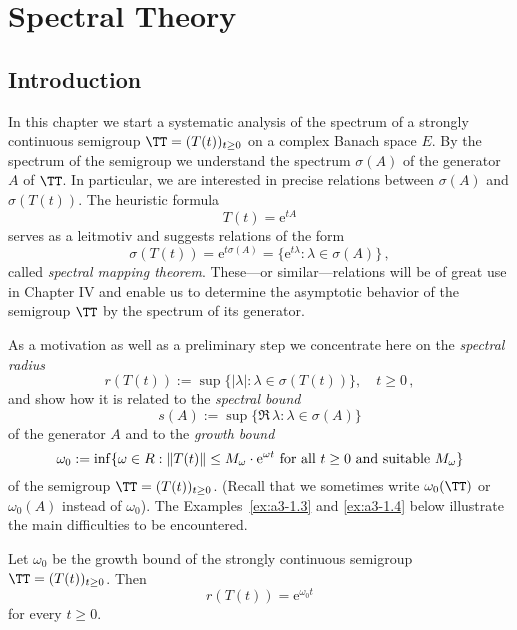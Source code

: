 \setcounter{chapter}{2}
\setcounter{section}{1}
\chapter{Spectral Theory}\label{chap:a3}
\section{Introduction}
In this chapter we start a systematic analysis of the spectrum of a strongly continuous semigroup $\TT = (T(t))_{t\geq 0}$ on a complex Banach space $E$.
By the spectrum of the semigroup we understand the spectrum $\sigma(A)$ of the generator $A$ of $\TT$.
In particular, we are interested in precise relations between $\sigma(A)$ and $\sigma(T(t))$.
The heuristic formula
\[
	T(t) = \mathrm{e}^{tA}
\]
serves as a leitmotiv and suggests relations of the form
\[
\sigma(T(t)) = \mathrm{e}^{t\sigma(A)} = \{ \mathrm{e}^{t\lambda} \colon \lambda \in \sigma(A) \}\,,
\]
called \emph{spectral mapping theorem}.
These---or similar---relations will be of great use in Chapter IV and enable us to determine the asymptotic behavior of the semigroup $\TT$ by the spectrum of its generator.

As a motivation as well as a preliminary step we concentrate here on the \emph{spectral radius}
\begin{equation}\label{eq:a3-1.1}
	r(T(t)) := \sup \{ |\lambda| : \lambda \in \sigma(T(t)) \}, \quad t \geq 0\,,
\end{equation}
and show how it is related to the \emph{spectral bound}
\begin{equation}\label{eq:a3-1.2}
	s(A) := \sup \{ \Re\,\lambda : \lambda \in \sigma(A) \}
\end{equation}
of the generator $A$ and to the \emph{growth bound}
\begin{equation}\label{eq:a3-1.3}
	\omega_{0} := \inf \{\omega \in \\R  : \|T(t)\| \leq M_{\omega}\cdot \mathrm{e}^{\omega t} \text{ for all } t \geq 0 \text{ and suitable } M_{\omega}\}
\end{equation}
of the semigroup $\TT = (T(t))_{t\geq 0}$.
(Recall that we sometimes write $\omega_{0}(\TT)$ or $\omega_{0}(A)$ instead of $\omega_{0}$).
%
The Examples~\ref{ex:a3-1.3} and \ref{ex:a3-1.4} below illustrate the main difficulties to be encountered.
\begin{proposition}\label{prop:a3-1.1}
Let $\omega_{0}$ be the growth bound of the strongly continuous semigroup $\TT = (T(t))_{t\geq 0}$.
Then
\begin{equation}\label{eq:a3-1.4}
	r(T(t)) = \mathrm{e}^{\omega_{0} t}
\end{equation}
for every $t \geq 0$.
\end{proposition}

